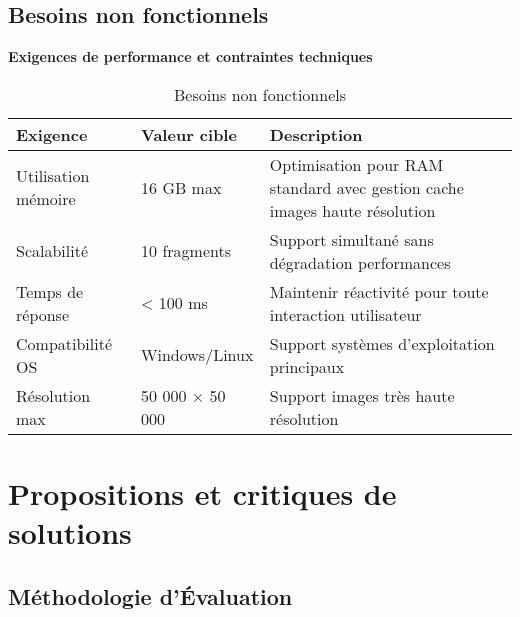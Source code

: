 \documentclass[12pt,a4paper]{report}
\begin{document}
\subsection{Besoins non fonctionnels}

\vspace{1em}
\begin{center}
\textbf{\large Exigences de performance et contraintes techniques}
\end{center}
\vspace{0.5em}

\begin{table}[H]
\centering
\begin{tabular}{|p{4cm}|p{3cm}|p{7cm}|}
\hline
\rowcolor{TableHeaderColor}
\textbf{Exigence} & \textbf{Valeur cible} & \textbf{Description} \\
\hline
Utilisation mémoire & 16 GB max & Optimisation pour RAM standard avec gestion cache images haute résolution \\
\hline
Scalabilité & 10 fragments & Support simultané sans dégradation performances \\
\hline
Temps de réponse & < 100 ms & Maintenir réactivité pour toute interaction utilisateur \\
\hline
Compatibilité OS & Windows/Linux & Support systèmes d'exploitation principaux \\
\hline
Résolution max & 50 000 × 50 000 & Support images très haute résolution \\
\hline
\end{tabular}
\caption{Besoins non fonctionnels}
\end{table}

\section{Propositions et critiques de solutions}


\subsection{Méthodologie d'Évaluation}
\end{document}
